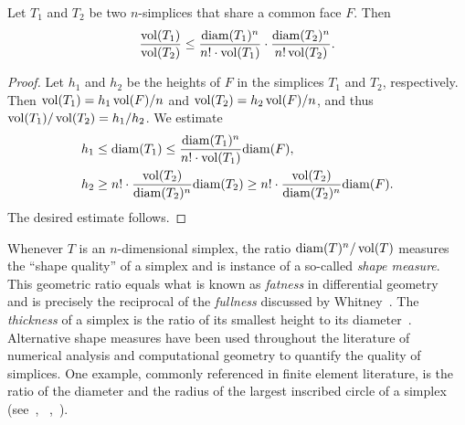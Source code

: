 \documentclass[a4paper]{amsart}
\begin{document}
\begin{lemma}\label{lemma:volumecomparison}
    Let $T_1$ and $T_2$ be two $n$-simplices that share a common face $F$. Then 
    \[
        \frac{ \operatorname{vol}(T_1) }{ \operatorname{vol}(T_2) }
        \leq 
        \frac{{\operatorname{diam}}(T_1)^n}{n! \cdot \operatorname{vol}(T_1)} 
        \cdot 
        \frac{{\operatorname{diam}}(T_2)^n}{n! \operatorname{vol}(T_2)} 
        .
    \]
\end{lemma}
\begin{proof}
    Let $h_1$ and $h_2$ be the heights of $F$ in the simplices $T_1$ and $T_2$, respectively. 
    Then $\operatorname{vol}(T_1) = h_1 \operatorname{vol}(F)/n$ and $\operatorname{vol}(T_2) = h_2 \operatorname{vol}(F)/n$, and thus $\operatorname{vol}(T_1)/\operatorname{vol}(T_2) = h_1/h_2$.
    We estimate 
    \begin{align*}
        h_1 &\leq {\operatorname{diam}}(T_1) \leq \frac{{\operatorname{diam}}(T_1)^n}{n! \cdot \operatorname{vol}(T_1)} {\operatorname{diam}}(F),
        \\
        h_2 &\geq n! \cdot \frac{\operatorname{vol}(T_2)}{{\operatorname{diam}}(T_2)^n} {\operatorname{diam}}(T_2) \geq n! \cdot \frac{\operatorname{vol}(T_2)}{{\operatorname{diam}}(T_2)^n} {\operatorname{diam}}(F)
        .
    \end{align*}
    The desired estimate follows. 
\end{proof}


\begin{remark}
    Whenever $T$ is an $n$-dimensional simplex, the ratio ${\operatorname{diam}}(T)^n / \operatorname{vol}(T)$ measures the ``shape quality'' of a simplex and is instance of a so-called \emph{shape measure}. 
    This geometric ratio equals what is known as \emph{fatness} in differential geometry~\cite{cheeger1984curvature} and is precisely the reciprocal of the \emph{fullness} discussed by Whitney~\cite{whitney2012geometric}. 
    The \emph{thickness} of a simplex is the ratio of its smallest height to its diameter~\cite{munkres2016elementary}.
    Alternative shape measures have been used throughout the literature of numerical analysis and computational geometry to quantify the quality of simplices.
    One example, commonly referenced in finite element literature, is the ratio of the diameter and the radius of the largest inscribed circle of a simplex 
    (see~\cite[p.61, Definition 5.1]{braess2001finite}, ~\cite[p.97, Definition (4.2.16)]{brenner2008mathematical},~\cite[Definition~11.2]{ern2021finite}). 
\end{remark}
\end{document}
